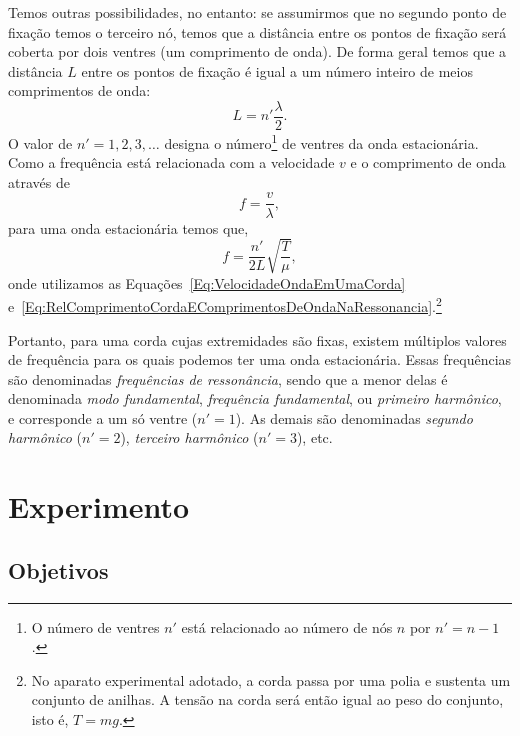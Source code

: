 Temos outras possibilidades, no entanto: se assumirmos que no segundo ponto de fixação temos o terceiro nó, temos que a distância entre os pontos de fixação será coberta por dois ventres (um comprimento de onda). De forma geral temos que a distância $L$ entre os pontos de fixação é igual a um número inteiro de meios comprimentos de onda:
\begin{equation}\label{Eq:RelComprimentoCordaEComprimentosDeOndaNaRessonancia}
    L = n'\frac{\lambda}{2}.
\end{equation}
%
O valor de $n' = 1, 2, 3, \dots$ designa o número\footnote{O número de ventres $n'$ está relacionado ao número de nós $n$ por $n'=n-1$.} de ventres da onda estacionária. Como a frequência está relacionada com a velocidade $v$ e o comprimento de onda através de
\begin{equation}
	f = \frac{v}{\lambda},
\end{equation}
%
para uma onda estacionária temos que,
\begin{equation}\label{Eq:RelacaoVariaveisOndasEstacionarias}
	f = \frac{n'}{2L}\sqrt{\frac{T}{\mu}},
\end{equation}
%
onde utilizamos as Equações~\eqref{Eq:VelocidadeOndaEmUmaCorda} e~\eqref{Eq:RelComprimentoCordaEComprimentosDeOndaNaRessonancia}.\footnote{No aparato experimental adotado, a corda passa por uma polia e sustenta um conjunto de anilhas. A tensão na corda será então igual ao peso do conjunto, isto é, $T = mg$.}

Portanto, para uma corda cujas extremidades são fixas, existem múltiplos valores de frequência para os quais podemos ter uma onda estacionária. Essas frequências são denominadas \emph{frequências de ressonância}, sendo que a menor delas é denominada \emph{modo fundamental}, \emph{frequência fundamental}, ou \emph{primeiro harmônico}, e corresponde a um só ventre ($n'=1$). As demais são denominadas \emph{segundo harmônico} ($n'=2$), \emph{terceiro harmônico} ($n'=3$), etc.

\section{Experimento}

\subsection{Objetivos}
\label{Sec:ObjetivosOndasEstacionarias}

